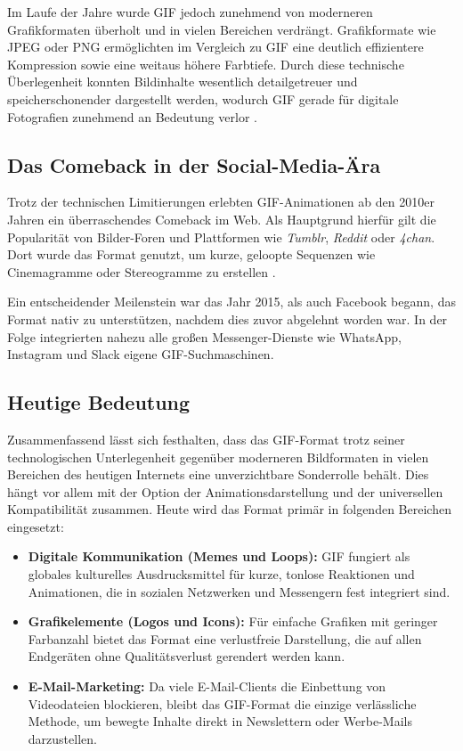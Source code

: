 \documentclass[a4paper,11pt]{scrartcl}
\theoremstyle{definition} %
\begin{document}
Im Laufe der Jahre wurde GIF jedoch zunehmend von moderneren Grafikformaten überholt und in vielen Bereichen verdrängt. Grafikformate wie JPEG oder PNG ermöglichten im Vergleich zu GIF eine deutlich effizientere Kompression sowie eine weitaus höhere Farbtiefe. Durch diese technische Überlegenheit konnten Bildinhalte wesentlich detailgetreuer und speicherschonender dargestellt werden, wodurch GIF gerade für digitale Fotografien zunehmend an Bedeutung verlor \parencite{adobe_gif_details}.

\subsection{Das Comeback in der Social-Media-Ära}
Trotz der technischen Limitierungen erlebten GIF-Animationen ab den 2010er Jahren ein überraschendes Comeback im Web. Als Hauptgrund hierfür gilt die Popularität von Bilder-Foren und Plattformen wie \textit{Tumblr}, \textit{Reddit} oder \textit{4chan}. Dort wurde das Format genutzt, um kurze, geloopte Sequenzen wie Cinemagramme oder Stereogramme zu erstellen \parencite{gif_comeback}.

Ein entscheidender Meilenstein war das Jahr 2015, als auch Facebook begann, das Format nativ zu unterstützen, nachdem dies zuvor abgelehnt worden war. In der Folge integrierten nahezu alle großen Messenger-Dienste wie WhatsApp, Instagram und Slack eigene GIF-Suchmaschinen.

\subsection{Heutige Bedeutung}
Zusammenfassend lässt sich festhalten, dass das GIF-Format trotz seiner technologischen Unterlegenheit gegenüber moderneren Bildformaten in vielen Bereichen des heutigen Internets eine unverzichtbare Sonderrolle behält. Dies hängt vor allem mit der Option der Animationsdarstellung und der universellen Kompatibilität zusammen. Heute wird das Format primär in folgenden Bereichen eingesetzt:

\begin{itemize}
    \item \textbf{Digitale Kommunikation (Memes und Loops):} GIF fungiert als globales kulturelles Ausdrucksmittel für kurze, tonlose Reaktionen und Animationen, die in sozialen Netzwerken und Messengern fest integriert sind.
    \item \textbf{Grafikelemente (Logos und Icons):} Für einfache Grafiken mit geringer Farbanzahl bietet das Format eine verlustfreie Darstellung, die auf allen Endgeräten ohne Qualitätsverlust gerendert werden kann.
    \item \textbf{E-Mail-Marketing:} Da viele E-Mail-Clients die Einbettung von Videodateien blockieren, bleibt das GIF-Format die einzige verlässliche Methode, um bewegte Inhalte direkt in Newslettern oder Werbe-Mails darzustellen.
\end{itemize}
\end{document}
